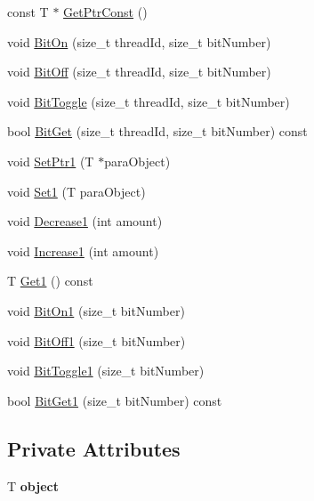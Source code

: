 \begin{DoxyCompactItemize}
\item 
const T $\ast$ \hyperlink{classcl_status_aa7afb6750c10435d9775e0955b5c143b}{GetPtrConst} ()
\item 
void \hyperlink{classcl_status_a2a83f70a7b38d591da6208b2075ec045}{BitOn} (size\_\-t threadId, size\_\-t bitNumber)
\item 
void \hyperlink{classcl_status_a151e63b93eed074dd78c358b19f99572}{BitOff} (size\_\-t threadId, size\_\-t bitNumber)
\item 
void \hyperlink{classcl_status_a6f7c5fdd9673ab82b336bf7a8379d4c6}{BitToggle} (size\_\-t threadId, size\_\-t bitNumber)
\item 
bool \hyperlink{classcl_status_afa919594c191a64b127bffd8bd5a657d}{BitGet} (size\_\-t threadId, size\_\-t bitNumber) const 
\item 
void \hyperlink{classcl_status_ada7352893eb088c75012944f6cd4a93c}{SetPtr1} (T $\ast$paraObject)
\item 
void \hyperlink{classcl_status_aec084c9695f3a2cd639c3f1ea76fefa0}{Set1} (T paraObject)
\item 
void \hyperlink{classcl_status_ab3902e569d571f62584859fa4c6a6357}{Decrease1} (int amount)
\item 
void \hyperlink{classcl_status_a038c3011a81235dc9c591df2212338dc}{Increase1} (int amount)
\item 
T \hyperlink{classcl_status_a68195ea79d9fe8d0e8570f88d6a8bfab}{Get1} () const 
\item 
void \hyperlink{classcl_status_a60e366ad2efbb7ed5c1d9096787fdfac}{BitOn1} (size\_\-t bitNumber)
\item 
void \hyperlink{classcl_status_abd2824d601519e3cb9f8e57f0064a130}{BitOff1} (size\_\-t bitNumber)
\item 
void \hyperlink{classcl_status_a71bdba0c662557aaddc7df731eabdc2d}{BitToggle1} (size\_\-t bitNumber)
\item 
bool \hyperlink{classcl_status_aad7982377f79bf78192a8deade72f784}{BitGet1} (size\_\-t bitNumber) const 
\end{DoxyCompactItemize}
\subsection*{Private Attributes}
\begin{DoxyCompactItemize}
\item 
\hypertarget{classcl_status_a522cc8b4793fffe358c6c0f3a72eed77}{
T {\bfseries object}}
\label{classcl_status_a522cc8b4793fffe358c6c0f3a72eed77}

\end{DoxyCompactItemize}


